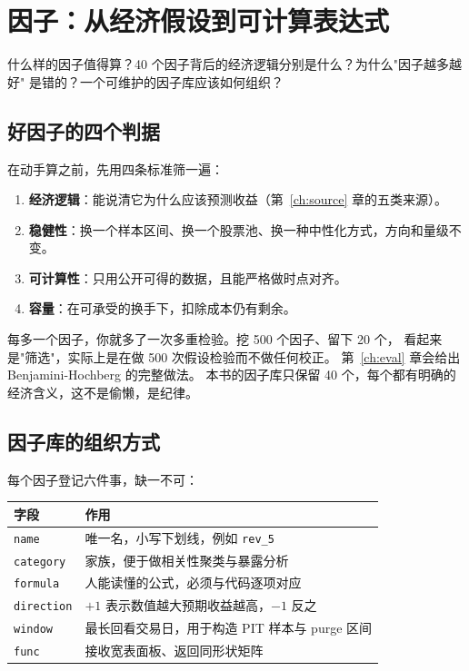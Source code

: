 \chapter{因子：从经济假设到可计算表达式}\label{ch:factor}

\begin{keybox}[本章要回答的问题]
什么样的因子值得算？40 个因子背后的经济逻辑分别是什么？为什么"因子越多越好"
是错的？一个可维护的因子库应该如何组织？
\end{keybox}

\section{好因子的四个判据}

在动手算之前，先用四条标准筛一遍：

\begin{enumerate}
  \item \textbf{经济逻辑}：能说清它为什么应该预测收益（第~\ref{ch:source} 章的五类来源）。
  \item \textbf{稳健性}：换一个样本区间、换一个股票池、换一种中性化方式，方向和量级不变。
  \item \textbf{可计算性}：只用公开可得的数据，且能严格做时点对齐。
  \item \textbf{容量}：在可承受的换手下，扣除成本仍有剩余。
\end{enumerate}

\begin{warnbox}
每多一个因子，你就多了一次多重检验。挖 500 个因子、留下 20 个，
看起来是"筛选"，实际上是在做 500 次假设检验而不做任何校正。
第~\ref{ch:eval} 章会给出 Benjamini-Hochberg 的完整做法。
本书的因子库只保留 40 个，每个都有明确的经济含义，这不是偷懒，是纪律。
\end{warnbox}

\section{因子库的组织方式}

每个因子登记六件事，缺一不可：

\begin{center}
\begin{tabular}{@{}ll@{}}
\toprule
\textbf{字段} & \textbf{作用} \\
\midrule
\texttt{name} & 唯一名，小写下划线，例如 \texttt{rev\_5} \\
\texttt{category} & 家族，便于做相关性聚类与暴露分析 \\
\texttt{formula} & 人能读懂的公式，必须与代码逐项对应 \\
\texttt{direction} & $+1$ 表示数值越大预期收益越高，$-1$ 反之 \\
\texttt{window} & 最长回看交易日，用于构造 PIT 样本与 purge 区间 \\
\texttt{func} & 接收宽表面板、返回同形状矩阵 \\
\bottomrule
\end{tabular}
\end{center}

